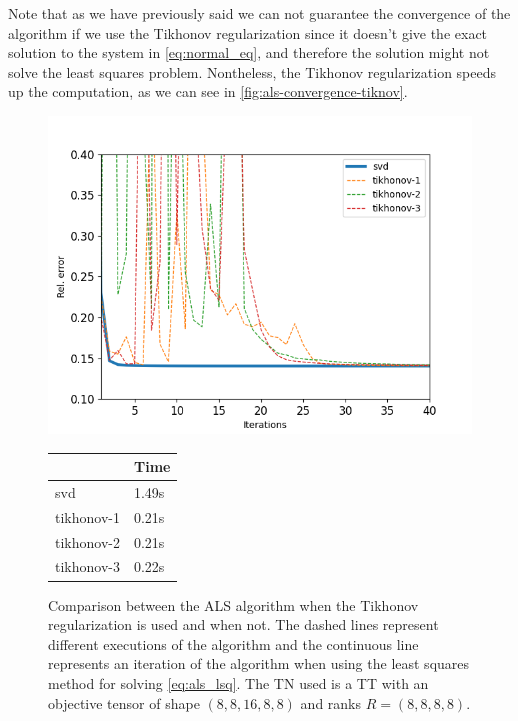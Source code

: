 \documentclass[11pt,a4paper,openright,oneside]{book}
\numberwithin{equation}{section}
\newcommand{\figref}[1]{\cref{#1}}
\newcommand{\refeq}[1]{\cref{#1}}
\begin{document}
{Note that as we have previously said we can not guarantee the convergence of the algorithm if we use the Tikhonov regularization since it doesn't give
the exact solution to the system in \refeq{eq:normal_eq}, and therefore the solution might not
solve the least squares problem. Nontheless, the Tikhonov regularization speeds up the 
computation, as we can see in \figref{fig:als-convergence-tiknov}.

\begin{figure}[H]
    \centering
    
   \begin{minipage}{0.7\textwidth}
    \includegraphics[width=\linewidth]{media/tikhonov-chart.png}
\end{minipage}
\begin{minipage}{0.25\textwidth}
    \centering
\begin{tabular}{l|l}
           & Time  \\ \hline
svd & 1.49s \\
tikhonov-1 & 0.21s \\
tikhonov-2 & 0.21s \\
tikhonov-3 & 0.22s
\end{tabular}
\end{minipage}
    \caption{Comparison between the ALS algorithm when the Tikhonov regularization is used and when not. The dashed lines
    represent different executions of the algorithm and the continuous line represents an iteration of the
    algorithm when using the least squares method for solving \ref{eq:als_lsq}. The TN used
    is a TT with an objective tensor of shape $(8,8,16,8,8)$ and ranks $R = (8,8,8,8)$.
}
\end{figure}}
\end{document}
